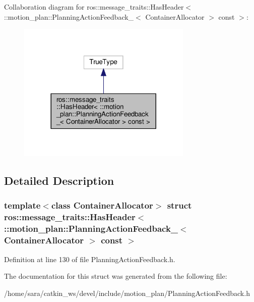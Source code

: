 Collaboration diagram for ros\+:\+:message\+\_\+traits\+:\+:Has\+Header$<$ \+:\+:motion\+\_\+plan\+:\+:Planning\+Action\+Feedback\+\_\+$<$ Container\+Allocator $>$ const $>$\+:
\nopagebreak
\begin{figure}[H]
\begin{center}
\leavevmode
\includegraphics[width=236pt]{structros_1_1message__traits_1_1HasHeader_3_01_1_1motion__plan_1_1PlanningActionFeedback___3_01C3b26b617e8b1d6671d0914ab8dbf299a}
\end{center}
\end{figure}


\subsection{Detailed Description}
\subsubsection*{template$<$class Container\+Allocator$>$\newline
struct ros\+::message\+\_\+traits\+::\+Has\+Header$<$ \+::motion\+\_\+plan\+::\+Planning\+Action\+Feedback\+\_\+$<$ Container\+Allocator $>$ const $>$}



Definition at line 130 of file Planning\+Action\+Feedback.\+h.



The documentation for this struct was generated from the following file\+:\begin{DoxyCompactItemize}
\item 
/home/sara/catkin\+\_\+ws/devel/include/motion\+\_\+plan/Planning\+Action\+Feedback.\+h\end{DoxyCompactItemize}
